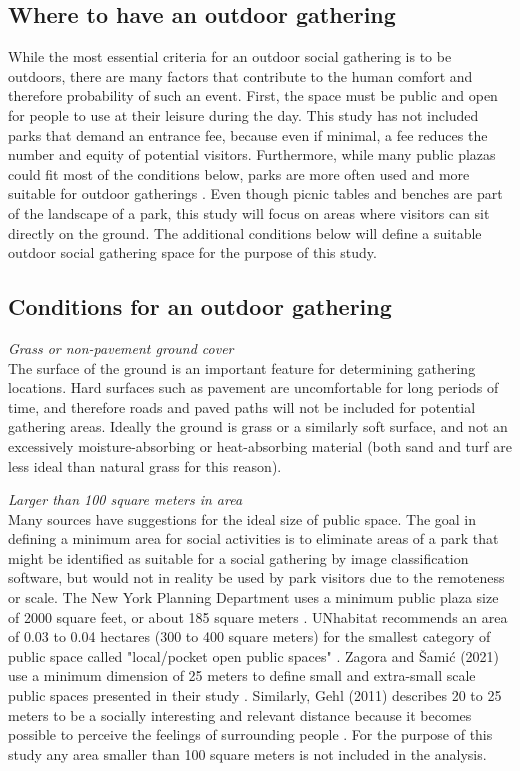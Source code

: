 \begin{multicols}{2}
\subsection{Where to have an outdoor gathering}
While the most essential criteria for an outdoor social gathering is to be outdoors, there are many factors that contribute to the human comfort and therefore probability of such an event. First, the space must be public and open for people to use at their leisure during the day. This study has not included parks that demand an entrance fee, because even if minimal, a fee reduces the number and equity of potential visitors. Furthermore, while many public plazas could fit most of the conditions below, parks are more often used and more suitable for outdoor gatherings \cite{thorsson_thermal_2007}. Even though picnic tables and benches are part of the landscape of a park, this study will focus on areas where visitors can sit directly on the ground. The additional conditions below will define a suitable outdoor social gathering space for the purpose of this study.

\subsection{Conditions for an outdoor gathering}\label{conditions}
\textit{Grass or non-pavement ground cover}\\
The surface of the ground is an important feature for determining gathering locations. Hard surfaces such as pavement are uncomfortable for long periods of time, and therefore roads and paved paths will not be included for potential gathering areas. Ideally the ground is grass or a similarly soft surface, and not an excessively moisture-absorbing or heat-absorbing material (both sand and turf are less ideal than natural grass for this reason). 

\textit{Larger than 100 square meters in area}\\
Many sources have suggestions for the ideal size of public space. The goal in defining a minimum area for social activities is to eliminate areas of a park that might be identified as suitable for a social gathering by image classification software, but would not in reality be used by park visitors due to the remoteness or scale. The New York Planning Department uses a minimum public plaza size of 2000 square feet, or about 185 square meters \cite{noauthor_privately_nodate}. UNhabitat recommends an area of 0.03 to 0.04 hectares (300 to 400 square meters) for the smallest category of public space called "local/pocket open public spaces" \cite{noauthor_public_nodate}. Zagora and Šamić (2021) use a minimum dimension of 25 meters to define small and extra-small scale public spaces presented in their study \cite{zagora_urban_2021}. Similarly, Gehl (2011) describes 20 to 25 meters to be a socially interesting and relevant distance because it becomes possible to perceive the feelings of surrounding people \cite{gehl_life_2011}. For the purpose of this study any area smaller than 100 square meters is not included in the analysis. 


\end{multicols}
